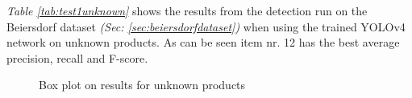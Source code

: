 \textit{Table \ref{tab:test1unknown}} shows the results from the detection run on the Beiersdorf dataset \textit{(Sec: \ref{sec:beiersdorfdataset})} when using the trained YOLOv4 network on unknown products. As can be seen item nr. 12 has the best average precision, recall and F-score.

\clearpage

\begin{figure}[h]
    \centering
    \hfill
    
    \caption{Box plot on results for unknown products}
    \label{fig:unknowniou}
\end{figure}

